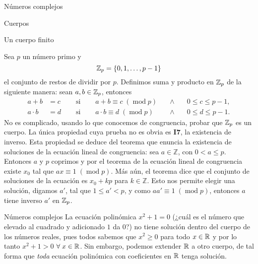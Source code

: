 \begin{chapter}{N\'umeros complejos}
\begin{section}{Cuerpos}
\begin{subsection}{Un cuerpo finito}
        \begin{ejemplo*}
            Sea $p$ un número primo y
            $$
                \mathbb Z_p = \{0,1,\ldots, p-1\}
            $$
            el conjunto de restos de dividir por $p$. Definimos suma y producto en $\mathbb Z_p$ de la siguiente manera: sean $a,b \in \mathbb Z_p$,  entonces
            \begin{equation*}
                \begin{array}{llllll}
                    a+b       & = c\quad & \text{ si }\quad & a+b \equiv c \; (\operatorname{mod}p) \quad & \wedge\quad & 0 \le c \le p-1, \\
                    a \cdot b & = d\quad & \text{ si }\quad & a\cdot b \equiv d \; (\operatorname{mod}p)  & \wedge      & 0 \le d \le p-1.
                \end{array}
            \end{equation*}
            No es complicado, usando lo que conocemos de congruencia, probar que $\mathbb Z_p$  es un cuerpo. La única propiedad cuya prueba no es obvia es  \textbf{I7}, la existencia de inverso. Esta propiedad se deduce del teorema que enuncia la existencia de soluciones  de la ecuación lineal de congruencia: sea $a \in \mathbb{Z}$, con $0<a\le p$. Entonces $a$ y $p$ coprimos y por el teorema de la ecuación lineal de congruencia  existe $x_0$ tal que $ax \equiv 1 \; (\operatorname{mod}p)$. Más aún, el teorema dice que el conjunto de soluciones de la ecuación es $x_0 + kp$ para $k \in \mathbb{Z}$. Esto nos permite elegir una solución, digamos $a'$, tal que $1 \le a' < p$, y como $aa' \equiv 1 \; (\operatorname{mod}p)$, entonces $a$ tiene inverso $a'$ en $\mathbb Z_p$.
        \end{ejemplo*}

    \end{subsection}
 \end{section}

 \begin{section}{N\'umeros complejos}\label{seccion-numeros-complejos}
    La ecuación polinómica $x^2 + 1 =0$ (¿cuál es el número que elevado  al cuadrado y adicionado $1$ da $0$?) no tiene solución dentro del cuerpo de los números reales,  pues todos sabemos que  $x^2 \ge 0$ para todo $x \in \mathbb R$ y por lo tanto $x^2 + 1 >0$ $\forall\; x \in \mathbb R$. Sin embargo, podemos extender $\mathbb R$ a otro cuerpo,  de tal forma que \textit{toda} ecuación polinómica con coeficientes en $\mathbb R$ tenga solución.


\end{section}
\end{chapter}
